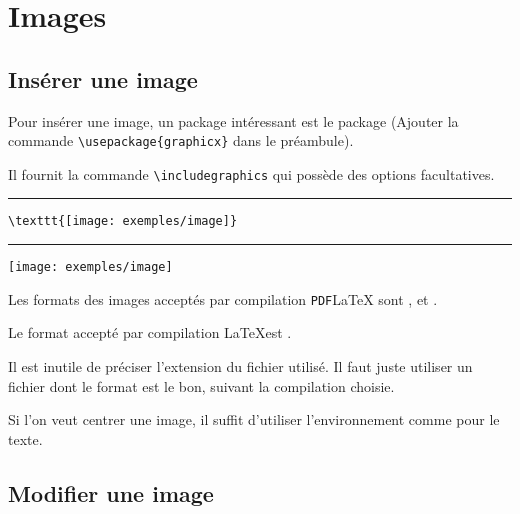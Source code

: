 \chapter{Images}

\section{Insérer une image}

Pour insérer une image, un package intéressant est le package  (Ajouter la commande \verb!\usepackage{graphicx}! dans le préambule).

Il fournit la commande \verb!\includegraphics! qui possède des options facultatives.

\bigskip

\begin{minipage}{0.6\linewidth}
\color{blue}\rule{9cm}{1pt}\color{black}
\vspace*{-12pt}

\begin{small}
\begin{verbatim}
\texttt{[image: exemples/image]}
\end{verbatim}
\end{small}

\vspace*{-12pt}
\color{blue}\rule{9cm}{1pt}\color{black}
\end{minipage}
\hfill
\begin{minipage}{0.35\linewidth}
\texttt{[image: exemples/image]}
\end{minipage}

\medskip

Les formats des images acceptés par compilation \texttt{PDF}\LaTeX{} sont ,  et .

Le format accepté par compilation \LaTeX est .

Il est inutile de préciser l'extension du fichier utilisé. Il faut juste utiliser un fichier dont le format est le bon, suivant la compilation choisie.

\begin{info}
Si l'on veut centrer une image, il suffit d'utiliser l'environnement  comme pour le texte.
\end{info}

\section{Modifier une image}


